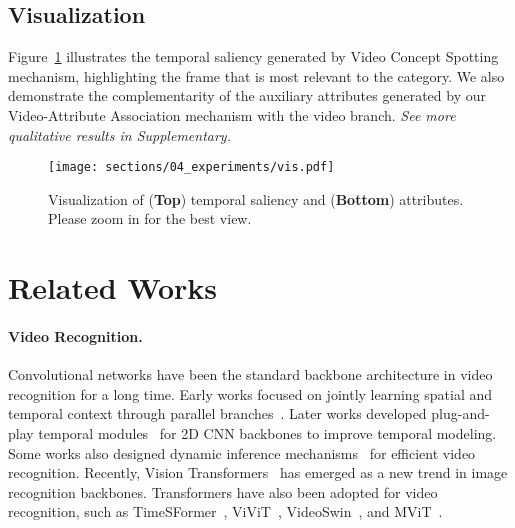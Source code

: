 \documentclass[10pt,twocolumn,letterpaper]{article}
\begin{document}
%
 






\subsection{Visualization}
Figure~\ref{fig:vis} illustrates the temporal saliency generated by Video Concept Spotting mechanism, highlighting the frame that is most relevant to the category. We also demonstrate the complementarity of the auxiliary attributes generated by our Video-Attribute Association mechanism with the video branch.
\emph{See more qualitative results in Supplementary.}


\begin{figure}[ht]
\begin{center}
\texttt{[image: sections/04\_experiments/vis.pdf]}
\end{center}
\vspace{-1mm}
\caption{Visualization of (\textbf{Top}) temporal saliency and (\textbf{Bottom}) attributes. Please zoom in for the best view.
}
\label{fig:vis}
\end{figure}


 \section{Related Works}
\paragraph{Video Recognition.} 
Convolutional networks have been the standard backbone architecture in video recognition for a long time. Early works focused on jointly learning spatial and temporal context through parallel branches~\cite{two-stream,two-stream-stresnet,tsn,slowfast,wang2020symbiotic,wang2021interactive}. Later works developed plug-and-play temporal modules~\cite{wu2020MVFNet,dsanet,teinet,li2020tea,liu2021tam,p3d,s3d,r2+1d,tdn} for 2D CNN backbones to improve temporal modeling. Some works also designed dynamic inference mechanisms~\cite{nsnet,tsqnet,wu2020dynamic,wu2019multi,adafocus,wang2023differentiable} for efficient video recognition. Recently, Vision Transformers~\cite{ViT,DeiT,liu2021swin} has emerged as a new trend in image recognition backbones. Transformers have also been adopted for video recognition, such as TimeSFormer~\cite{timesformer}, ViViT~\cite{arnab2021vivit}, VideoSwin~\cite{videoswin}, and MViT~\cite{mvit}.
\end{document}
